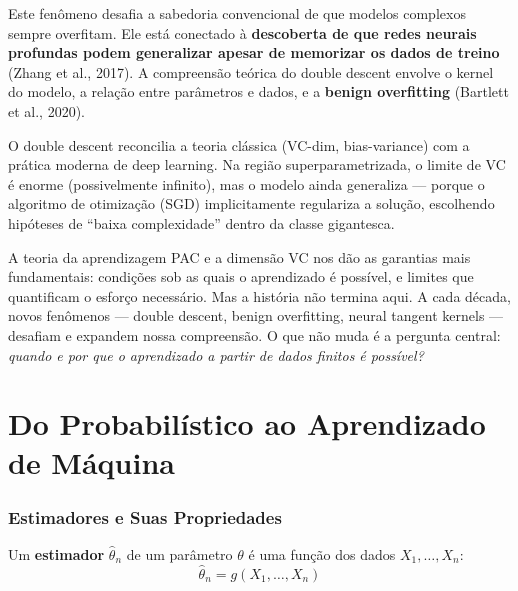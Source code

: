 \documentclass{tufte-handout}
\begin{document}
Este fenômeno desafia a sabedoria convencional de que modelos complexos sempre overfitam. Ele está conectado à \textbf{descoberta de que redes neurais profundas podem generalizar apesar de memorizar os dados de treino} (Zhang et al., 2017). A compreensão teórica do double descent envolve o kernel do modelo, a relação entre parâmetros e dados, e a \textbf{benign overfitting} (Bartlett et al., 2020).

\begin{remark}
    O double descent reconcilia a teoria clássica (VC-dim, bias-variance) com a prática moderna de deep learning. Na região superparametrizada, o limite de VC é enorme (possivelmente infinito), mas o modelo ainda generaliza --- porque o algoritmo de otimização (SGD) implicitamente regulariza a solução, escolhendo hipóteses de ``baixa complexidade'' dentro da classe gigantesca.
\end{remark}

A teoria da aprendizagem PAC e a dimensão VC nos dão as garantias mais fundamentais: condições sob as quais o aprendizado é possível, e limites que quantificam o esforço necessário. Mas a história não termina aqui. A cada década, novos fenômenos --- double descent, benign overfitting, neural tangent kernels --- desafiam e expandem nossa compreensão. O que não muda é a pergunta central: \textit{quando e por que o aprendizado a partir de dados finitos é possível?}



\part{Do Probabilístico ao Aprendizado de Máquina}

\section{Estimadores e Suas Propriedades}

\begin{defn}[Estimador]
    Um \textbf{estimador} $\hat{\theta}_n$ de um parâmetro $\theta$ é uma função dos
    dados $X_1, \dots, X_n$:
    \[
    \hat{\theta}_n = g(X_1, \dots, X_n)
    \]
\end{defn}
\end{document}
